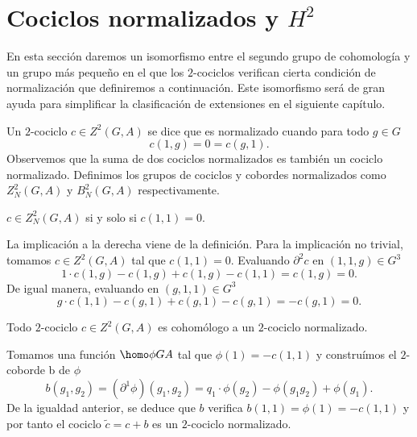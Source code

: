 \section{Cociclos normalizados y $H^2$}

En esta sección daremos un isomorfismo entre el segundo grupo de cohomología y un grupo más pequeño en el que los $2$-cociclos verifican cierta condición de normalización que definiremos a continuación. Este isomorfismo será de gran ayuda para simplificar la clasificación de extensiones en el siguiente capítulo.


\begin{definicion}
	Un $2$-cociclo $c\in Z^2(G,A)$ se dice que es normalizado cuando para todo $g\in G$
	\begin{equation*}
		c(1,g)= 0 = c(g,1).
	\end{equation*}
	Observemos que la suma de dos cociclos normalizados es también un cociclo normalizado. Definimos los grupos de cociclos y cobordes normalizados como $Z^2_N(G,A)$ y $B^2_N(G,A)$ respectivamente.
\end{definicion}

\begin{proposicion}
	$c\in Z^2_N(G,A)$ si y solo si $c(1,1)=0$.
	\begin{demostracion}
		La implicación a la derecha viene de la definición. Para la implicación no trivial, tomamos $c\in Z^2(G,A)$ tal que $c(1,1) = 0$. 
		Evaluando $\partial^2 c$ en $(1,1,g)\in G^3$
		\begin{equation*}
			1\cdot c(1,g) - c(1,g) + c(1,g) - c(1,1) = c(1,g) =0.
		\end{equation*} 
		De igual manera, evaluando en $(g,1,1)\in G^3$
		\begin{equation*}
			g\cdot c(1,1) - c(g,1) + c(g,1) - c(g,1) = -c(g,1) = 0.
		\end{equation*}
	\end{demostracion}
\end{proposicion}

\begin{lema}\label{prop:normcoc}
	Todo $2$-cociclo $c\in Z^2(G,A)$ es cohomólogo a un $2$-cociclo normalizado. %
	\begin{demostracion}
		Tomamos una función $\homo \phi G A$ tal que $\phi(1) = -c(1,1)$ y construímos el $2$-coborde b de $\phi$
		\begin{equation*}
			b(g_1,g_2) = (\partial^1 \phi)(g_1,g_2) =  q_1\cdot \phi(g_2) - \phi(g_1g_2) + \phi(g_1).
		\end{equation*}
		De la igualdad anterior, se deduce  que $b$ verifica $b(1,1) = \phi(1) = -c(1,1)$ y por tanto el cociclo $\tilde c = c+b$ es un $2$-cociclo normalizado.
	\end{demostracion}
\end{lema}

